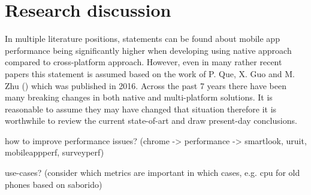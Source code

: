 
\chapter{Research discussion}

In multiple literature positions, statements can be found about mobile app performance being significantly higher when developing using native approach compared to cross-platform approach. However, even in many rather recent papers this statement is assumed based on the work of P. Que, X. Guo and M. Zhu (\cite{que_comp_hybrid_native}) which was published in 2016. Across the past 7 years there have been many breaking changes in both native and multi-platform solutions. It is reasonable to assume they may have changed that situation therefore it is worthwhile to review the current state-of-art and draw present-day conclusions.

how to improve performance issues? (chrome -> performance -> smartlook, uruit, mobileappperf, surveyperf)

use-cases? (consider which metrics are important in which cases, e.g. cpu for old phones based on saborido)
